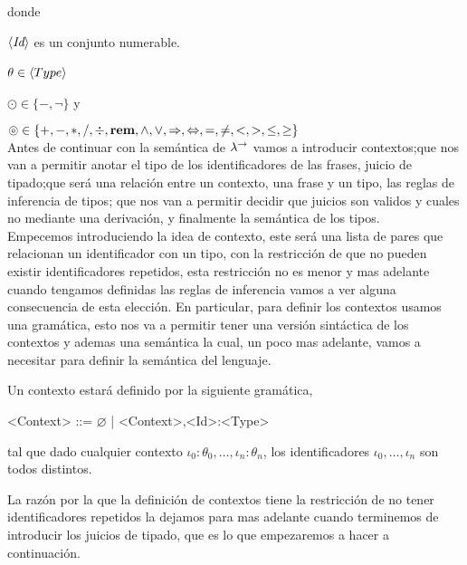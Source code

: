 \noindent
donde \ 

$\langle \textit{Id} \rangle$ es un conjunto numerable.

$\theta \in \langle Type \rangle$ \

$\odot \in \{-, \neg\}$ y \

$\circledcirc \in \{+,-,*,/,\div,\textbf{rem},\wedge,\vee,\Rightarrow,\Leftrightarrow, =,\neq,<,>,\leq,\geq\}$\\

Antes de continuar con la sem\'antica de $\lambda^{\rightarrow}$
vamos a introducir contextos;que nos van a permitir anotar el tipo
de los identificadores de las frases, juicio de tipado;que ser\'a una relaci\'on
entre un contexto, una frase y un tipo, las reglas de inferencia de tipos;
que nos van a permitir decidir que juicios son validos y cuales no mediante una derivaci\'on, y
finalmente la sem\'antica de los tipos.\\

Empecemos introduciendo la idea de contexto, este ser\'a una lista 
de pares que relacionan un identificador 
con un tipo, con la restricci\'on de que no pueden
existir identificadores repetidos, esta restricci\'on no es menor y mas
adelante cuando tengamos definidas las reglas de inferencia vamos a
ver alguna consecuencia de esta elecci\'on. En particular, para
definir los contextos usamos una gram\'atica, esto
nos va a permitir tener una versi\'on sint\'actica de los contextos
y ademas una sem\'antica la cual, un poco mas adelante, vamos a
necesitar para definir la sem\'antica del lenguaje.

\begin{definition}\label{lambdaa:context}

Un contexto estar\'a definido por la siguiente gram\'atica,\

\begin{grammar}

<Context> ::= $\varnothing$ | <Context>,<Id>:<Type>

\end{grammar}

tal que dado cualquier contexto $\iota_0:\theta_0,\ldots,\iota_n:\theta_n$, los
identificadores $\iota_0,\ldots,\iota_n$ son todos distintos.

\end{definition}

La razón por la que la definici\'on de contextos tiene la restricci\'on de
no tener identificadores repetidos la
dejamos para mas adelante cuando terminemos de introducir los juicios de tipado, 
que es lo que empezaremos a hacer a continuaci\'on.

